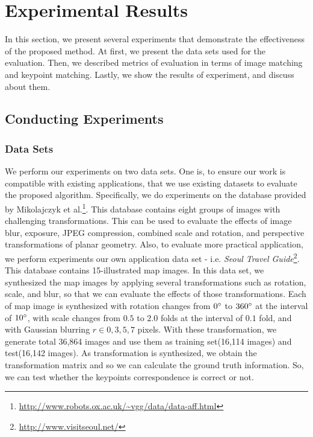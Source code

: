 

\section{Experimental Results}

In this section, we present several experiments that demonstrate the effectiveness of the proposed method. At first, we present the data sets used for the evaluation. Then, we described metrics of evaluation in terms of image matching and keypoint matching. Lastly, we show the results of experiment, and discuss about them.

\subsection{Conducting Experiments}
\subsubsection{Data Sets}
We perform our experiments on two data sets. One is, to ensure our work is compatible with existing applications, that we use existing datasets to evaluate the proposed algorithm. Specifically, we do experiments on the database provided by Mikolajczyk et al.\footnote{\url{http://www.robots.ox.ac.uk/~vgg/data/data-aff.html}}\cite{mikolajczyk_comparison_2005}. This database contains eight groups of images with challenging transformations. This can be used to evaluate the effects of image blur, exposure, JPEG compression, combined scale and rotation, and perspective transformations of planar geometry. 
Also, to evaluate more practical application, we perform experiments our own application data set - i.e. \textit{Seoul Travel Guide}\footnote{\url{http://www.visitseoul.net/}}. This database contains 15-illustrated map images. In this data set, we synthesized the map images by applying several transformations such as rotation, scale, and blur, so that we can evaluate the effects of those transformations. Each of map image is synthesized with rotation changes from $0\degree$ to $360\degree$ at the interval of $10\degree$, with scale changes from $0.5$ to $2.0$ folds at the interval of $0.1$ fold, and with Gaussian blurring $r \in {0, 3, 5, 7}$ pixels. With these transformation, we generate total 36,864 images and use them as training set(16,114 images) and test(16,142 images). As transformation is synthesized, we obtain the transformation matrix and so we can calculate the ground truth information. So, we can test whether the keypoints correspondence is correct or not. 


